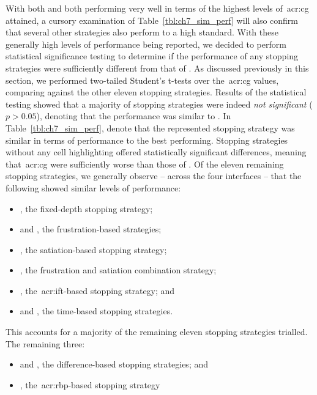 With both  and  both performing very well in terms of the highest levels of~\gls{acr:cg} attained, a cursory examination of Table~\ref{tbl:ch7_sim_perf} will also confirm that several other strategies also perform to a high standard. With these generally high levels of performance being reported, we decided to perform statistical significance testing to determine if the performance of any stopping strategies were sufficiently different from that of . As discussed previously in this section, we performed two-tailed Student's t-tests over the~\gls{acr:cg} values, comparing  against the other eleven stopping strategies. Results of the statistical testing showed that a majority of stopping strategies were indeed \emph{not significant} ($p>0.05$), denoting that the performance was similar to . In Table~\ref{tbl:ch7_sim_perf},  denote that the represented stopping strategy was similar in terms of performance to the best performing. Stopping strategies without any cell highlighting offered statistically significant differences, meaning that~\gls{acr:cg} were sufficiently worse than those of . Of the eleven remaining stopping strategies, we generally observe -- across the four interfaces -- that the following showed similar levels of performance:

\begin{itemize}
    \item{, the fixed-depth stopping strategy;}
    \item{ and , the frustration-based strategies;}
    \item{, the satiation-based stopping strategy;}
    \item{, the frustration and satiation combination strategy;}
    \item{, the~\gls{acr:ift}-based stopping strategy; and}
    \item{ and , the time-based stopping strategies.}
\end{itemize}

This accounts for a majority of the remaining eleven stopping strategies trialled. The remaining three:

\begin{itemize}
    \item{ and , the difference-based stopping strategies; and}
    \item{, the~\gls{acr:rbp}-based stopping strategy}
\end{itemize}

